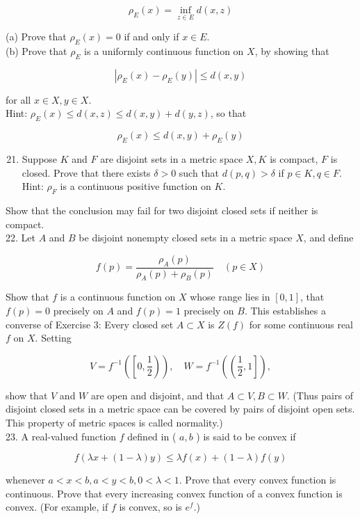 \documentclass[10pt]{article}
\begin{document}
$$
\rho_{E}(x)=\inf _{z \in E} d(x, z)
$$

(a) Prove that $\rho_{E}(x)=0$ if and only if $x \in E$.\\
(b) Prove that $\rho_{E}$ is a uniformly continuous function on $X$, by showing that

$$
\left|\rho_{E}(x)-\rho_{E}(y)\right| \leq d(x, y)
$$

for all $x \in X, y \in X$.\\
Hint: $\rho_{E}(x) \leq d(x, z) \leq d(x, y)+d(y, z)$, so that

$$
\rho_{E}(x) \leq d(x, y)+\rho_{E}(y)
$$

\begin{enumerate}
  \setcounter{enumi}{20}
  \item Suppose $K$ and $F$ are disjoint sets in a metric space $X, K$ is compact, $F$ is closed. Prove that there exists $\delta>0$ such that $d(p, q)>\delta$ if $p \in K, q \in F$. Hint: $\rho_{F}$ is a continuous positive function on $K$.
\end{enumerate}

Show that the conclusion may fail for two disjoint closed sets if neither is compact.\\
22. Let $A$ and $B$ be disjoint nonempty closed sets in a metric space $X$, and define

$$
f(p)=\frac{\rho_{A}(p)}{\rho_{A}(p)+\rho_{B}(p)} \quad(p \in X)
$$

Show that $f$ is a continuous function on $X$ whose range lies in $[0,1]$, that $f(p)=0$ precisely on $A$ and $f(p)=1$ precisely on $B$. This establishes a converse of Exercise 3: Every closed set $A \subset X$ is $Z(f)$ for some continuous real $f$ on $X$. Setting

$$
V=f^{-1}\left(\left[0, \frac{1}{2}\right)\right), \quad W=f^{-1}\left(\left(\frac{1}{2}, 1\right]\right),
$$

show that $V$ and $W$ are open and disjoint, and that $A \subset V, B \subset W$. (Thus pairs of disjoint closed sets in a metric space can be covered by pairs of disjoint open sets. This property of metric spaces is called normality.)\\
23. A real-valued function $f$ defined in ( $a, b$ ) is said to be convex if

$$
f(\lambda x+(1-\lambda) y) \leq \lambda f(x)+(1-\lambda) f(y)
$$

whenever $a<x<b, a<y<b, 0<\lambda<1$. Prove that every convex function is continuous. Prove that every increasing convex function of a convex function is convex. (For example, if $f$ is convex, so is $e^{f}$.)
\end{document}
